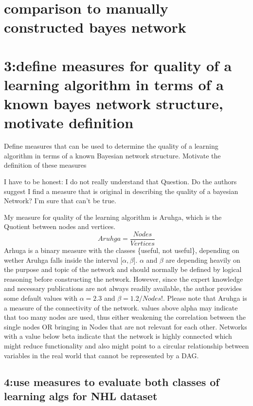 \documentclass[]{article}
\begin{document}
\clearpage

\section{comparison to manually constructed bayes
network}\label{comparison-to-manually-constructed-bayes-network}

\section{3:define measures for quality of a learning algorithm in terms
of a known bayes network structure, motivate
definition}\label{define-measures-for-quality-of-a-learning-algorithm-in-terms-of-a-known-bayes-network-structure-motivate-definition}

Define measures that can be used to determine the quality of a learning
algorithm in terms of a known Bayesian network structure. Motivate the
definition of these measures

I have to be honest: I do not really understand that Question. Do the
authors suggest I find a measure that is original in describing the
quality of a bayesian Network? I'm sure that can't be true.

My measure for quality of the learning algorithm is Aruhga, which is the
Quotient between nodes and vertices.
\[Aruhga = \frac{Nodes}{Vertices}\]Arhuga is a binary measure with the
classes \{useful, not useful\}, depending on wether Aruhga falls inside
the interval {[}$\alpha , \beta${]}. $\alpha$ and $\beta$ are depending
heavily on the purpose and topic of the network and should normally be
defined by logical reasoning before constructing the network. However,
since the expert knowledge and necessary publications are not always
readily available, the author provides some default values with
$\alpha = 2.3$ and $\beta = 1.2/Nodes!$. Please note that Aruhga is a
measure of the connectivity of the network. values above alpha may
indicate that too many nodes are used, thus either weakening the
correlation between the single nodes OR bringing in Nodes that are not
relevant for each other. Networks with a value below beta indicate that
the network is highly connected which might reduce functionality and
also might point to a circular relationship between variables in the
real world that cannot be represented by a DAG.

\subsection{4:use measures to evaluate both classes of learning algs for
NHL
dataset}\label{use-measures-to-evaluate-both-classes-of-learning-algs-for-nhl-dataset}
\end{document}
